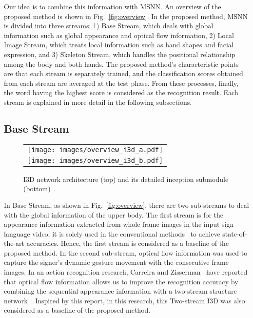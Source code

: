 \documentclass[journal]{IEEEtran}
\begin{document}
Our idea is to combine this information with MSNN. An overview of the proposed method is shown in Fig.~\ref{fig:overview}. 
In the proposed method, MSNN is divided into three streams: 
1) Base Stream, which deals with global information such as global appearance and optical flow information, 
2) Local Image Stream, which treats local information such as hand shapes and facial expression, 
and 3) Skeleton Stream, which handles the positional relationship among the body and both hands. The proposed method's characteristic points are that each stream is separately trained, and the classification scores obtained from each stream are averaged at the test phase. From these processes, finally, the word having the highest score is considered as the recognition result. Each stream is explained in more detail in the following subsections.







\subsection{Base Stream}

\begin{figure}[tb]
  \centering
    \begin{tabular}{c}
      \begin{minipage}{\hsize}
        \centering
          \texttt{[image: images/overview\_i3d\_a.pdf]}
      \end{minipage}\\

      \begin{minipage}{\hsize}
        \centering
          \texttt{[image: images/overview\_i3d\_b.pdf]}
      \end{minipage}
    \end{tabular}
    \caption{I3D network architecture (top) and its detailed inception submodule (bottom)~\cite{joao2017i3d}.}
    \label{fig:i3d}
  
\end{figure}
In Base Stream, as shown in Fig.~\ref{fig:overview}, there are two sub-streams to deal with the global information of the upper body. The first stream is for the appearance information extracted from whole frame images in the input sign language video;
it is solely used in the conventional methods~\cite{li2020word, vaezi2019ms-asl} to achieve state-of-the-art accuracies.
Hence, the first stream is considered as a baseline of the proposed method.
In the second sub-stream, optical flow information was used to capture the signer's dynamic gesture movement with the consecutive frame images. 
In an action recognition research, Carreira and Zisserman~\cite{joao2017i3d} have reported that 
optical flow information allows us to improve the recognition accuracy 
by combining the sequential appearance information with a two-stream structure network~\cite{joao2017i3d}. 
Inspired by this report, 
in this research, 
this Two-stream I3D was also considered as a baseline of the proposed method. 
\end{document}
